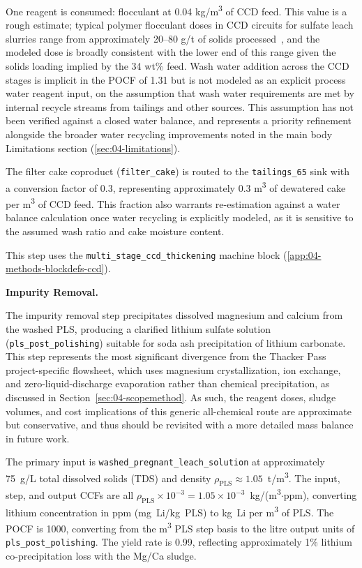 One reagent is consumed: flocculant at 0.04 kg/m\textsuperscript{3} of CCD feed. This value is a rough estimate; typical polymer flocculant doses in CCD circuits for sulfate leach slurries range from approximately 20--80 g/t of solids processed~\cite{sgscanadaincSK1300Technical2024}, and the modeled dose is broadly consistent with the lower end of this range given the solids loading implied by the 34 wt\% feed. Wash water addition across the CCD stages is implicit in the POCF of 1.31 but is not modeled as an explicit process water reagent input, on the assumption that wash water requirements are met by internal recycle streams from tailings and other sources. This assumption has not been verified against a closed water balance, and represents a priority refinement alongside the broader water recycling improvements noted in the main body Limitations section (\ref{sec:04-limitations}).

The filter cake coproduct (\texttt{filter\_cake}) is routed to the \texttt{tailings\_65} sink with a conversion factor of 0.3, representing approximately 0.3 m\textsuperscript{3} of dewatered cake per m\textsuperscript{3} of CCD feed. This fraction also warrants re-estimation against a water balance calculation once water recycling is explicitly modeled, as it is sensitive to the assumed wash ratio and cake moisture content.

This step uses the \texttt{multi\_stage\_ccd\_thickening} machine block (\ref{app:04-methods-blockdefs-ccd}).

\medskip
\noindent\textbf{Impurity Removal.}\quad

The impurity removal step precipitates dissolved magnesium and calcium from the washed PLS, producing a clarified lithium sulfate solution (\texttt{pls\_post\_polishing}) suitable for soda ash precipitation of lithium carbonate. This step represents the most significant divergence from the Thacker Pass project-specific flowsheet, which uses magnesium crystallization, ion exchange, and zero-liquid-discharge evaporation rather than chemical precipitation, as discussed in Section~\ref{sec:04-scopemethod}. As such, the reagent doses, sludge volumes, and cost implications of this generic all-chemical route are approximate but conservative, and thus should be revisited with a more detailed mass balance in future work.

The primary input is \texttt{washed\_pregnant\_leach\_solution} at approximately 75~g/L total dissolved solids (TDS) and density $\rho_\text{PLS} \approx 1.05$~t/m\textsuperscript{3}. The input, step, and output CCFs are all $\rho_\text{PLS} \times 10^{-3} = 1.05 \times 10^{-3}$~kg/(m\textsuperscript{3}$\cdot$ppm), converting lithium concentration in ppm (mg~Li/kg~PLS) to kg~Li per m\textsuperscript{3} of PLS. The POCF is 1000, converting from the m\textsuperscript{3} PLS step basis to the litre output units of \texttt{pls\_post\_polishing}. The yield rate is 0.99, reflecting approximately 1\% lithium co-precipitation loss with the Mg/Ca sludge.

